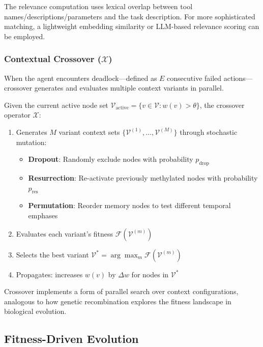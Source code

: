 The relevance computation uses lexical overlap between tool names/descriptions/parameters and the task description. For more sophisticated matching, a lightweight embedding similarity or LLM-based relevance scoring can be employed.

\subsubsection{Contextual Crossover ($\mathcal{X}$)}

When the agent encounters deadlock---defined as $E$ consecutive failed actions---crossover generates and evaluates multiple context variants in parallel.

\begin{definition}
Given the current active node set $\mathcal{V}_{\text{active}} = \{v \in \mathcal{V} : w(v) > \theta\}$, the crossover operator $\mathcal{X}$:
\begin{enumerate}
    \item Generates $M$ variant context sets $\{\mathcal{V}^{(1)}, \ldots, \mathcal{V}^{(M)}\}$ through stochastic mutation:
    \begin{itemize}
        \item \textbf{Dropout}: Randomly exclude nodes with probability $p_{\text{drop}}$
        \item \textbf{Resurrection}: Re-activate previously methylated nodes with probability $p_{\text{res}}$
        \item \textbf{Permutation}: Reorder memory nodes to test different temporal emphases
    \end{itemize}
    \item Evaluates each variant's fitness $\mathcal{F}(\mathcal{V}^{(m)})$
    \item Selects the best variant $\mathcal{V}^* = \arg\max_m \mathcal{F}(\mathcal{V}^{(m)})$
    \item Propagates: increases $w(v)$ by $\Delta w$ for nodes in $\mathcal{V}^*$
\end{enumerate}
\end{definition}

Crossover implements a form of parallel search over context configurations, analogous to how genetic recombination explores the fitness landscape in biological evolution.

\subsection{Fitness-Driven Evolution}
\label{sec:fitness}

